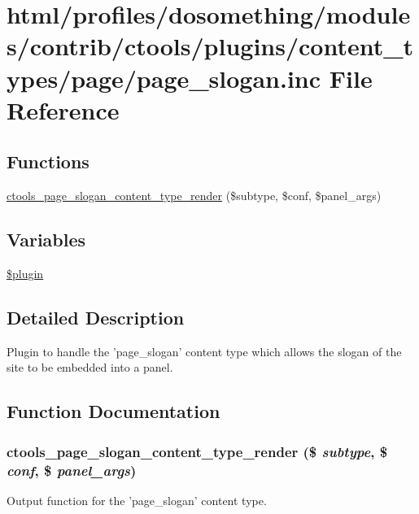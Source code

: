 \hypertarget{page__slogan_8inc}{
\section{html/profiles/dosomething/modules/contrib/ctools/plugins/content\_\-types/page/page\_\-slogan.inc File Reference}
\label{page__slogan_8inc}
}
\subsection*{Functions}
\begin{DoxyCompactItemize}
\item 
\hyperlink{page__slogan_8inc_a46580e86d77e3a03aa7ddb3481a26b6e}{ctools\_\-page\_\-slogan\_\-content\_\-type\_\-render} (\$subtype, \$conf, \$panel\_\-args)
\end{DoxyCompactItemize}
\subsection*{Variables}
\begin{DoxyCompactItemize}
\item 
\hyperlink{page__slogan_8inc_ada8a7130088351710bb02ed622d6bf65}{\$plugin}
\end{DoxyCompactItemize}


\subsection{Detailed Description}
Plugin to handle the 'page\_\-slogan' content type which allows the slogan of the site to be embedded into a panel. 

\subsection{Function Documentation}
\hypertarget{page__slogan_8inc_a46580e86d77e3a03aa7ddb3481a26b6e}{
\subsubsection[{ctools\_\-page\_\-slogan\_\-content\_\-type\_\-render}]{\setlength{\rightskip}{0pt plus 5cm}ctools\_\-page\_\-slogan\_\-content\_\-type\_\-render (\$ {\em subtype}, \/  \$ {\em conf}, \/  \$ {\em panel\_\-args})}}
\label{page__slogan_8inc_a46580e86d77e3a03aa7ddb3481a26b6e}
Output function for the 'page\_\-slogan' content type.

